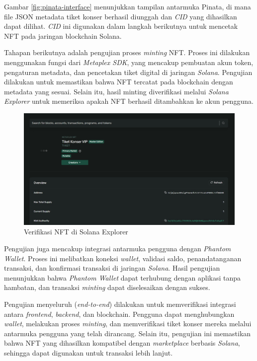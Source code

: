 Gambar \ref{fig:pinata-interface} menunjukkan tampilan antarmuka Pinata, di mana file JSON metadata tiket konser berhasil diunggah dan \textit{CID} yang dihasilkan dapat dilihat. \textit{CID} ini digunakan dalam langkah berikutnya untuk mencetak NFT pada jaringan blockchain Solana.

Tahapan berikutnya adalah pengujian proses \textit{minting} NFT. Proses ini dilakukan menggunakan fungsi dari \textit{Metaplex SDK}, yang mencakup pembuatan akun token, pengaturan metadata, dan pencetakan tiket digital di jaringan \textit{Solana}. Pengujian dilakukan untuk memastikan bahwa NFT tercatat pada blockchain dengan metadata yang sesuai. Selain itu, hasil minting diverifikasi melalui \textit{Solana Explorer} untuk memeriksa apakah NFT berhasil ditambahkan ke akun pengguna.

\begin{figure}[H]
    \centering
    \includegraphics[width=1\textwidth]{gambar/3.2.5}
    \caption{Verifikasi NFT di Solana Explorer}
    \label{fig:solana-explorer}
\end{figure}
Pengujian juga mencakup integrasi antarmuka pengguna dengan \textit{Phantom Wallet}. Proses ini melibatkan koneksi \textit{wallet}, validasi saldo, penandatanganan transaksi, dan konfirmasi transaksi di jaringan \textit{Solana}. Hasil pengujian menunjukkan bahwa \textit{Phantom Wallet} dapat terhubung dengan aplikasi tanpa hambatan, dan transaksi \textit{minting} dapat diselesaikan dengan sukses. 


Pengujian menyeluruh (\textit{end-to-end}) dilakukan untuk memverifikasi integrasi antara \textit{frontend}, \textit{backend}, dan blockchain. Pengguna dapat menghubungkan \textit{wallet}, melakukan proses \textit{minting}, dan memverifikasi tiket konser mereka melalui antarmuka pengguna yang telah dirancang. Selain itu, pengujian ini memastikan bahwa NFT yang dihasilkan kompatibel dengan \textit{marketplace} berbasis \textit{Solana}, sehingga dapat digunakan untuk transaksi lebih lanjut. 

